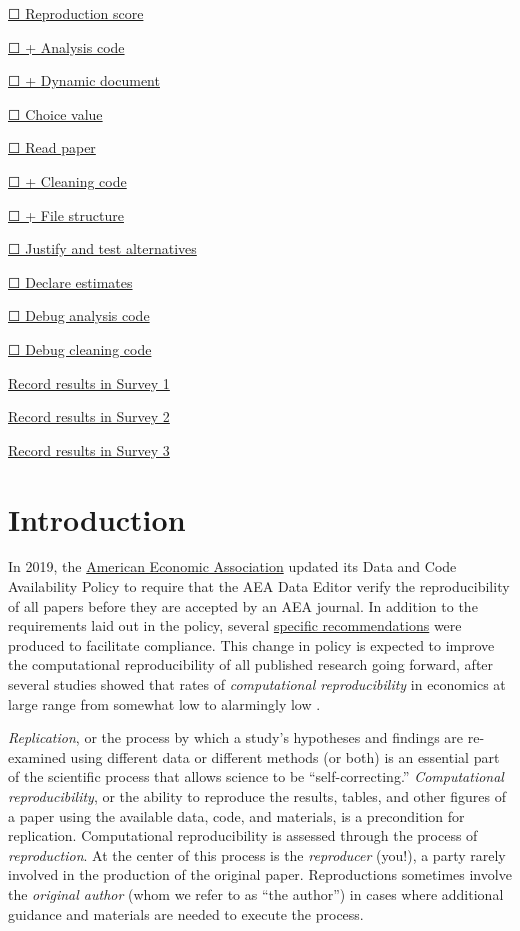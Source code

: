 \documentclass[]{book}
\begin{document}
\protect\hyperlink{score}{☐ Reproduction score}

\protect\hyperlink{ac}{☐ + Analysis code}

\protect\hyperlink{paper-level}{☐ + Dynamic document}

\protect\hyperlink{id-val}{☐ Choice value}

\protect\hyperlink{read-summ}{☐ Read paper}

\protect\hyperlink{cc}{☐ + Cleaning code}

\protect\hyperlink{paper-level}{☐ + File structure}

\protect\hyperlink{test-rob}{☐ Justify and test alternatives}

\protect\hyperlink{declare-estimates}{☐ Declare estimates}

\protect\hyperlink{dac}{☐ Debug analysis code}

\protect\hyperlink{dcc}{☐ Debug cleaning code}

\href{https://berkeley.qualtrics.com/jfe/form/SV_2bO83uJvU9ZiTXv}{Record results in Survey 1}

\href{https://berkeley.qualtrics.com/jfe/form/SV_2gd9Y3XVtjLpZL7}{Record results in Survey 2}

\href{ADD\%20LINK}{Record results in Survey 3}

\hypertarget{intro}{%
\chapter*{Introduction}\label{intro}}

In 2019, the \href{https://www.aeaweb.org/journals/policies/data-code/}{American Economic Association} updated its Data and Code Availability Policy to require that the AEA Data Editor verify the reproducibility of all papers before they are accepted by an AEA journal. In addition to the requirements laid out in the policy, several \href{https://aeadataeditor.github.io/aea-de-guidance/}{specific recommendations} were produced to facilitate compliance. This change in policy is expected to improve the computational reproducibility of all published research going forward, after several studies showed that rates of \emph{computational reproducibility} in economics at large range from somewhat low to alarmingly low \citep{galiani2018make, chang2015economics, kingi2018reproducibility}.

\emph{Replication}, or the process by which a study's hypotheses and findings are re-examined using different data or different methods (or both) \citep{King95} is an essential part of the scientific process that allows science to be ``self-correcting.'' \emph{Computational reproducibility}, or the ability to reproduce the results, tables, and other figures of a paper using the available data, code, and materials, is a precondition for replication. Computational reproducibility is assessed through the process of \emph{reproduction}. At the center of this process is the \emph{reproducer} (you!), a party rarely involved in the production of the original paper. Reproductions sometimes involve the \emph{original author} (whom we refer to as ``the author'') in cases where additional guidance and materials are needed to execute the process.
\end{document}
